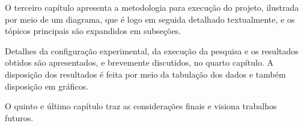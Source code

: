         O terceiro capítulo apresenta a metodologia para execução do projeto, ilustrada por meio de um diagrama, que é logo em seguida detalhado textualmente, e os tópicos principais são expandidos em subseções.

        Detalhes da configuração experimental, da execução da pesquisa e os resultados obtidos são apresentados, e brevemente discutidos, no quarto capítulo. 
        A disposição dos resultados é feita por meio da tabulação dos dados e também disposição em gráficos.

        O quinto e último capítulo traz as considerações finais e visiona trabalhos futuros.
